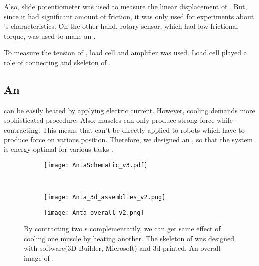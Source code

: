 Also, slide potentiometer was used to measure the linear displacement of \scpnospace. But, since it had significant amount of friction, it was only used for experiments about \scpnospace's characteristics. On the other hand, rotary sensor, which had low frictional torque, was used to make an \antanospace. 

To measure the tension of \scpnospace, load cell and amplifier was used.
Load cell played a role of connecting \scp and skeleton of \antanospace.

\subsection{An \ANTA}
\scp can be easily heated by applying electric current. However, cooling demands more sophisticated procedure. Also, muscles can only produce strong force while contracting. This means that \scp can't be directly applied to robots which have to produce force on various position. Therefore, we designed an \antanospace, so that the system is energy-optimal for various tasks \cite{antagonism}.

\begin{figure}[t]
	\centering
	\begin{subfigure}[t]{0.5\textwidth}
		\centering\texttt{[image: AntaSchematic\_v3.pdf]}
		\caption{\label{anta_sch}}
	\end{subfigure}
	~			
	\begin{subfigure}[t]{0.3\textwidth}
		\centering\texttt{[image: Anta\_3d\_assemblies\_v2.png]}
		\caption{\label{3d_assemblies}}
	\end{subfigure}
	
	\begin{subfigure}[t]{0.81\textwidth}
		\centering\texttt{[image: Anta\_overall\_v2.png]}
		\caption{\label{anta_overall}}
	\end{subfigure}
	
	\caption[An \anta]{ By contracting two \scpnospace s complementarily, we can get same effect of cooling one muscle by heating another.  The skeleton of \anta was designed with software(3D Builder, Microsoft) and 3d-printed.  An overall image of \antanospace.}
	\label{anta_design}
\end{figure}

